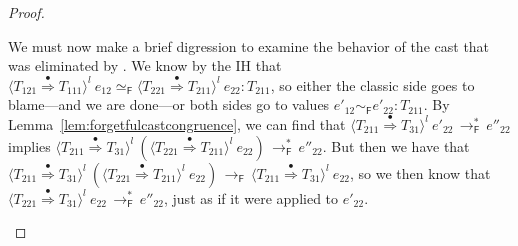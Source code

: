 \documentclass[9pt]{extarticle}
\newcommand{\ottnt}[1]{\mathit{#1}}
\begin{document}
{\begin{lemma}
\begin{proof}
{\begin{itemize}
\begin{itemize}
        We must now make a brief digression to examine the behavior of
        the cast that was eliminated by .
We know by the IH that $  \langle  \ottnt{T_{{\mathrm{121}}}}  \mathord{ \overset{\bullet}{\Rightarrow} }  \ottnt{T_{{\mathrm{111}}}}  \rangle^{ \ottnt{l} } ~  \ottnt{e_{{\mathrm{12}}}}    \simeq _{  \mathsf{F}  }   \langle  \ottnt{T_{{\mathrm{221}}}}  \mathord{ \overset{\bullet}{\Rightarrow} }  \ottnt{T_{{\mathrm{211}}}}  \rangle^{ \ottnt{l} } ~  \ottnt{e_{{\mathrm{22}}}}   :  \ottnt{T_{{\mathrm{211}}}} $, so either the classic side goes to blame---and
        we are done---or both sides go to values $ \ottnt{e'_{{\mathrm{12}}}}   \sim _{  \mathsf{F}  }  \ottnt{e'_{{\mathrm{22}}}}  :  \ottnt{T_{{\mathrm{211}}}} $.  By Lemma~\ref{lem:forgetfulcastcongruence}, we can
        find that $ \langle  \ottnt{T_{{\mathrm{211}}}}  \mathord{ \overset{\bullet}{\Rightarrow} }  \ottnt{T_{{\mathrm{31}}}}  \rangle^{ \ottnt{l} } ~  \ottnt{e'_{{\mathrm{22}}}}  \,  \longrightarrow ^{*}_{  \mathsf{F}  }  \, \ottnt{e''_{{\mathrm{22}}}}$ implies
        $ \langle  \ottnt{T_{{\mathrm{211}}}}  \mathord{ \overset{\bullet}{\Rightarrow} }  \ottnt{T_{{\mathrm{31}}}}  \rangle^{ \ottnt{l} } ~   (  \langle  \ottnt{T_{{\mathrm{221}}}}  \mathord{ \overset{\bullet}{\Rightarrow} }  \ottnt{T_{{\mathrm{211}}}}  \rangle^{ \ottnt{l} } ~  \ottnt{e_{{\mathrm{22}}}}  )   \,  \longrightarrow ^{*}_{  \mathsf{F}  }  \, \ottnt{e''_{{\mathrm{22}}}}$.
But then we have that $ \langle  \ottnt{T_{{\mathrm{211}}}}  \mathord{ \overset{\bullet}{\Rightarrow} }  \ottnt{T_{{\mathrm{31}}}}  \rangle^{ \ottnt{l} } ~   (  \langle  \ottnt{T_{{\mathrm{221}}}}  \mathord{ \overset{\bullet}{\Rightarrow} }  \ottnt{T_{{\mathrm{211}}}}  \rangle^{ \ottnt{l} } ~  \ottnt{e_{{\mathrm{22}}}}  )   \,  \longrightarrow _{  \mathsf{F}  }  \,  \langle  \ottnt{T_{{\mathrm{211}}}}  \mathord{ \overset{\bullet}{\Rightarrow} }  \ottnt{T_{{\mathrm{31}}}}  \rangle^{ \ottnt{l} } ~  \ottnt{e_{{\mathrm{22}}}} $, so we then know that $ \langle  \ottnt{T_{{\mathrm{221}}}}  \mathord{ \overset{\bullet}{\Rightarrow} }  \ottnt{T_{{\mathrm{31}}}}  \rangle^{ \ottnt{l} } ~  \ottnt{e_{{\mathrm{22}}}}  \,  \longrightarrow ^{*}_{  \mathsf{F}  }  \, \ottnt{e''_{{\mathrm{22}}}}$, just as if it were applied to $\ottnt{e'_{{\mathrm{22}}}}$.


\end{itemize}
\end{itemize}}
\end{proof}
\end{lemma}}
\end{document}
